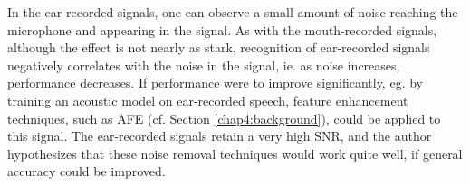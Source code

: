 \DIFaddbegin 

\DIFaddend In the ear-recorded signals, one can observe a small amount of noise reaching the microphone and appearing in the signal.  As with the mouth-recorded signals, although the effect is not nearly as stark, recognition of ear-recorded signals negatively correlates with the noise in the signal, ie. as noise increases, performance decreases.   If performance were to improve significantly, eg. by training an acoustic model on ear-recorded speech, feature enhancement techniques, such as AFE (cf. Section \ref{chap4:background}), could be applied to this signal.  The ear-recorded signals retain a very high SNR, and the author hypothesizes that these noise removal techniques would work quite well, if general accuracy could be improved.



